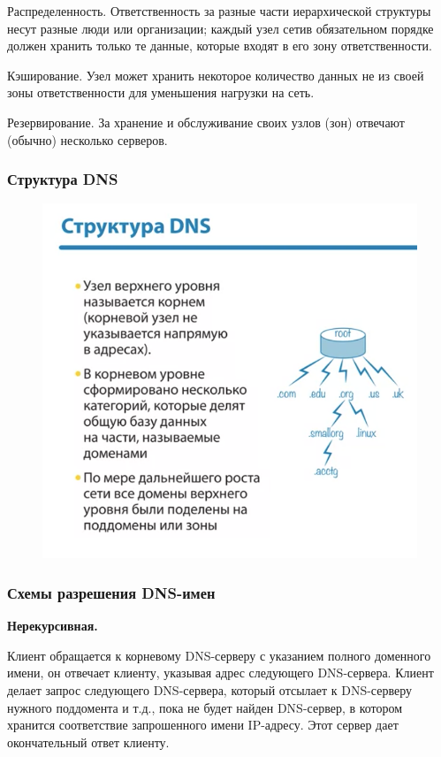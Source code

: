 \documentclass[a4paper,12pt]{article}
\begin{document}
	Распределенность. Ответственность за разные части иерархической структуры несут разные люди или организации; каждый узел сетив обязательном порядке должен хранить только те данные, которые входят в его зону ответственности.
	
	Кэширование. Узел может хранить некоторое количество данных не из своей зоны ответственности для уменьшения нагрузки на сеть.
	
	Резервирование. За хранение и обслуживание своих узлов (зон) отвечают (обычно) несколько серверов.
	
	\subsubsection{Структура DNS}
	
	\begin{figure}[h!]
		\begin{center}
			{\includegraphics[scale = 1]{11.png}}
			\label{11}
		\end{center}
	\end{figure}
	
	\subsubsection{Схемы разрешения DNS-имен}
	
	{\bf Нерекурсивная.}
	
	Клиент обращается к корневому DNS-серверу с указанием полного доменного имени, он отвечает клиенту, указывая адрес следующего DNS-сервера. Клиент делает запрос следующего DNS-сервера, который отсылает к DNS-серверу нужного поддомента и т.д., пока не будет найден DNS-сервер, в котором хранится соответствие запрошенного имени IP-адресу. Этот сервер дает окончательный ответ клиенту.
	
\end{document}
